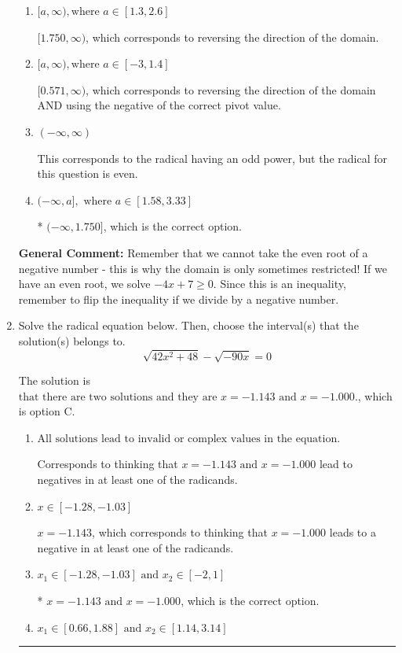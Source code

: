 \documentclass{extbook}[14pt]
\newcommand{\litem}[1]{\item #1

\rule{\textwidth}{0.4pt}}
\begin{document}
\begin{enumerate}
{\begin{enumerate}[label=\Alph*.]
$(-\infty, 0.571]$, which corresponds to using the negative of the correct pivot value.
\item \( [a, \infty), \text{where } a \in [1.3, 2.6] \)

 $[1.750, \infty)$, which corresponds to reversing the direction of the domain.
\item \( [a, \infty), \text{where } a \in [-3, 1.4] \)

$[0.571, \infty)$, which corresponds to reversing the direction of the domain AND using the negative of the correct pivot value.
\item \( (-\infty, \infty) \)

This corresponds to the radical having an odd power, but the radical for this question is even.
\item \( (-\infty, a], \text{ where } a \in [1.58, 3.33] \)

* $(-\infty, 1.750]$, which is the correct option.
\end{enumerate}

\textbf{General Comment:} Remember that we cannot take the even root of a negative number - this is why the domain is only sometimes restricted! If we have an even root, we solve $-4 x + 7 \geq 0$. Since this is an inequality, remember to flip the inequality if we divide by a negative number.
}
\litem{
Solve the radical equation below. Then, choose the interval(s) that the solution(s) belongs to.
\[ \sqrt{42 x^2 + 48} - \sqrt{-90 x} = 0 \]

The solution is \( \text{that there are two solutions and they are } x = -1.143 \text{ and } x = -1.000. \), which is option C.\begin{enumerate}[label=\Alph*.]
\item \( \text{All solutions lead to invalid or complex values in the equation.} \)

Corresponds to thinking that $x = -1.143 \text{ and } x = -1.000$ lead to negatives in at least one of the radicands.
\item \( x \in [-1.28,-1.03] \)

$x = -1.143$, which corresponds to thinking that $x = -1.000$ leads to a negative in at least one of the radicands.
\item \( x_1 \in [-1.28, -1.03] \text{ and } x_2 \in [-2,1] \)

* $x = -1.143 \text{ and } x = -1.000$, which is the correct option.
\item \( x_1 \in [0.66, 1.88] \text{ and } x_2 \in [1.14,3.14] \)


\end{enumerate}}
\end{enumerate}
\end{document}
